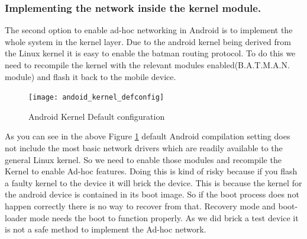 \subsubsection{Implementing the network inside the kernel module.}

The second option to enable ad-hoc networking in Android is to implement the whole system in the kernel layer. Due to the android kernel being derived from the Linux kernel it is easy to enable the batman routing protocol. To do this we need to recompile the kernel with the relevant modules enabled(B.A.T.M.A.N. module) and flash it back to the mobile device.

\begin{figure}[H]
    \centering
    \texttt{[image: andoid\_kernel\_defconfig]}
    \caption{Android Kernel Default configuration}
    \label{fig:pca_df_dfgh_efege_fef_z}
\end{figure}
\vspace{12pt}
As you can see in the above Figure \ref{fig:pca_df_dfgh_efege_fef_z} default Android compilation setting does not include the most basic network drivers which are readily available to the general Linux kernel. So we need to enable those modules and recompile the Kernel to enable Ad-hoc features.
Doing this is kind of risky because if you flash a faulty kernel to the device it will brick the device. This is because the kernel for the android device is contained in its boot image. So if the boot process does not happen correctly there is no way to recover from that. Recovery mode and boot-loader mode needs the boot to function properly. As we did brick a test device it is not a safe method to implement the Ad-hoc network.

\clearpage


